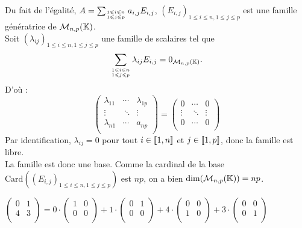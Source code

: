 \documentclass{book}
\begin{document}
\begin{Demonstration}
Du fait de l'égalité, $ A = \sum _{1\leqslant i\leqslant n\atop 1\leqslant j\leqslant p}  a_{i,j} E_{i,j}$,  $(E_{i,j})_{1\leqslant i\leqslant n, 1\leqslant j\leqslant p}$ est une famille génératrice de $\mathcal{M}_{n,p}(\mathbb{K})$.\\
Soit  $(\lambda_{ij})_{1\leqslant i\leqslant n, 1\leqslant j\leqslant p}$ une famille de scalaires tel que
$$\sum _{1\leqslant i\leqslant n\atop 1\leqslant j\leqslant p}  \lambda_{ij} E_{i,j}=0_{\mathcal{M}_{n,p}(\mathbb{K})}.$$
D'où :
 $$\begin{pmatrix}
\lambda_{11} &  \cdots & \lambda_{1p}\\
\vdots & \ \ddots & \vdots\\
\lambda_{n1} &  \cdots & a_{np}\\
\end{pmatrix}= \begin{pmatrix}
0 &  \cdots &0\\
\vdots & \ \ddots & \vdots\\
0 &  \cdots & 0\\
\end{pmatrix}$$
Par identification, $\lambda_{ij}=0$ pour tout $i\in\mathopen\lbrack\!\lbrack1,n \mathclose\rbrack\!\rbrack$ et  $j\in\mathopen\lbrack\!\lbrack1,p \mathclose\rbrack\!\rbrack$, donc la famille est libre.\\
La famille est donc une base. Comme la cardinal de la base $\mathrm{Card}((E_{i,j})_{1\leqslant i\leqslant n, 1\leqslant j\leqslant p})$ est $np$, on a bien $\dim( \mathcal{M}_{n,p}(\mathbb{K}))=np$.
\end{Demonstration}
\begin{Exemple}$ \begin{pmatrix}
0 &1  \\
4 & 3 \\
\end{pmatrix} =
0\cdot
\begin{pmatrix}
1 &0  \\
0 & 0  \\
\end{pmatrix}
+
1\cdot
\begin{pmatrix}
0 &1  \\
0 & 0 \\
\end{pmatrix}
+
4\cdot
\begin{pmatrix}
0 &0  \\
1 & 0  \\
\end{pmatrix}
+
3\cdot
\begin{pmatrix}
0 &0  \\
0 & 1  \\
\end{pmatrix}
$
\end{Exemple}
\end{document}
